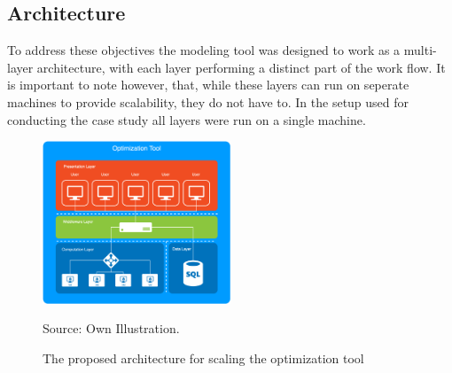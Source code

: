 \documentclass[
	11pt,								%
	DIV10,								%
	a4paper,         					%
	oneside,							%
	headheight=20pt,					%
	footheight=20pt,					%
    parskip=full,						%
    listof=totoc,						%
	bibliography=totoc,					%
	index=totoc,						%
]{scrartcl}
\begin{document}
\subsection{Architecture}
To address these objectives the modeling tool was designed to work as a multi-layer architecture, with each layer performing a distinct part of the work flow. It is important to note however, that, while these layers can run on seperate machines to provide scalability, they do not have to. In the setup used for conducting the case study all layers were run on a single machine. 
\begin{figure}[H]
	\centering
	\includegraphics[width=0.5\textwidth]{pictures/ARCHITECTURE.png}
	\caption{The proposed architecture for scaling the optimization tool}
	\label{architecture}
	\flushleft\quad\quad\footnotesize{Source: Own Illustration.}
\end{figure}	
\end{document}
